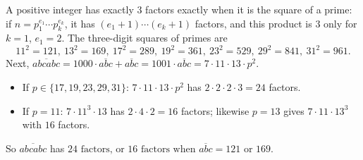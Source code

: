 A positive integer has exactly $3$ factors exactly when it is the square of a prime: if $n=p_1^{e_1}\cdots p_k^{e_k}$, it has $(e_1+1)\cdots(e_k+1)$ factors, and this product is $3$ only for $k=1$, $e_1=2$. The three-digit squares of primes are
\[11^2=121,\ 13^2=169,\ 17^2=289,\ 19^2=361,\ 23^2=529,\ 29^2=841,\ 31^2=961.\]
Next, $\overline{abcabc}=1000\cdot\overline{abc}+\overline{abc}=1001\cdot\overline{abc}=7\cdot11\cdot13\cdot p^2$.
\begin{itemize}
\item If $p\in\{17,19,23,29,31\}$: $7\cdot11\cdot13\cdot p^2$ has $2\cdot2\cdot2\cdot3=24$ factors.
\item If $p=11$: $7\cdot11^3\cdot13$ has $2\cdot4\cdot2=16$ factors; likewise $p=13$ gives $7\cdot11\cdot13^3$ with $16$ factors.
\end{itemize}
So $\overline{abcabc}$ has $\boxed{24\text{ factors, or }16\text{ factors when }\overline{abc}=121\text{ or }169}$.
